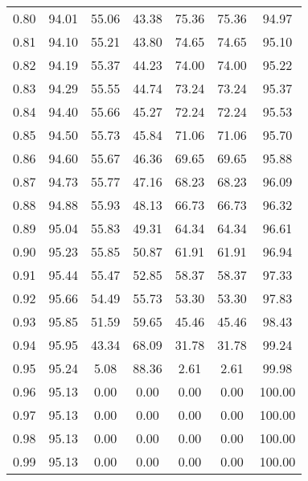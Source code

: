 \begin{tabular}{|c|c|c|c|c|c|c|}
      0.80 &     94.01 &     55.06 &      43.38 &   75.36 &      75.36 &         94.97 \\
      0.81 &     94.10 &     55.21 &      43.80 &   74.65 &      74.65 &         95.10 \\
      0.82 &     94.19 &     55.37 &      44.23 &   74.00 &      74.00 &         95.22 \\
      0.83 &     94.29 &     55.55 &      44.74 &   73.24 &      73.24 &         95.37 \\
      0.84 &     94.40 &     55.66 &      45.27 &   72.24 &      72.24 &         95.53 \\
      0.85 &     94.50 &     55.73 &      45.84 &   71.06 &      71.06 &         95.70 \\
      0.86 &     94.60 &     55.67 &      46.36 &   69.65 &      69.65 &         95.88 \\
      0.87 &     94.73 &     55.77 &      47.16 &   68.23 &      68.23 &         96.09 \\
      0.88 &     94.88 &     55.93 &      48.13 &   66.73 &      66.73 &         96.32 \\
      0.89 &     95.04 &     55.83 &      49.31 &   64.34 &      64.34 &         96.61 \\
      0.90 &     95.23 &     55.85 &      50.87 &   61.91 &      61.91 &         96.94 \\
      0.91 &     95.44 &     55.47 &      52.85 &   58.37 &      58.37 &         97.33 \\
      0.92 &     95.66 &     54.49 &      55.73 &   53.30 &      53.30 &         97.83 \\
      0.93 &     95.85 &     51.59 &      59.65 &   45.46 &      45.46 &         98.43 \\
      0.94 &     95.95 &     43.34 &      68.09 &   31.78 &      31.78 &         99.24 \\
      0.95 &     95.24 &      5.08 &      88.36 &    2.61 &       2.61 &         99.98 \\
      0.96 &     95.13 &      0.00 &       0.00 &    0.00 &       0.00 &        100.00 \\
      0.97 &     95.13 &      0.00 &       0.00 &    0.00 &       0.00 &        100.00 \\
      0.98 &     95.13 &      0.00 &       0.00 &    0.00 &       0.00 &        100.00 \\
      0.99 &     95.13 &      0.00 &       0.00 &    0.00 &       0.00 &        100.00 \\
\bottomrule
\end{tabular}
